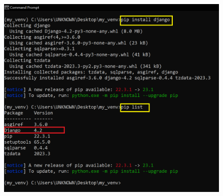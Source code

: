 \documentclass[12pt]{article}
\begin{document}
\begin{figure}[H]
	\centering
	\includegraphics[width =1\textwidth ,keepaspectratio]{imgs/install_dj.png}
	\caption{}
\end{figure}
\end{document}

